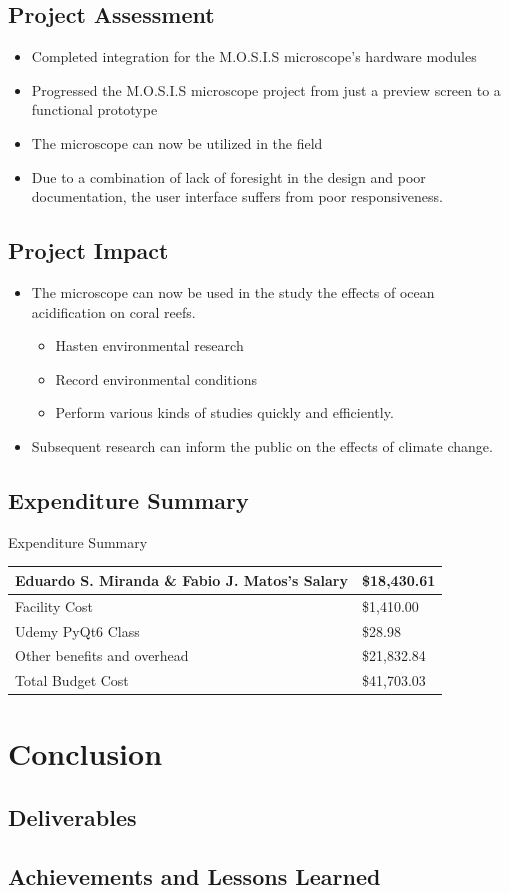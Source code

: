 \documentclass[17pt, aspectratio=169]{beamer}
\begin{document}
\subsection{Project Assessment}
\begin{itemize}
	\item Completed integration for the M.O.S.I.S microscope's hardware modules
	\item Progressed the M.O.S.I.S microscope project from just a preview screen to a functional prototype
	\item The microscope can now be utilized in the field
	\item Due to a combination of lack of foresight in the design and poor documentation, the user interface suffers from poor responsiveness.
\end{itemize}
\subsection*{Project Impact}
\begin{itemize}
	\item The microscope can now be used in the study the effects of ocean acidification on coral reefs.
	      \begin{itemize}
		      \item Hasten environmental research
		      \item Record environmental conditions
		      \item Perform various kinds of studies quickly and efficiently.
	      \end{itemize}
	\item Subsequent research can inform the public on the effects of climate change.
\end{itemize}
\subsection*{Expenditure Summary}
\begin{frame}{Expenditure Summary}
	\begin{center}
		\begin{tabular}{||m{} | m{} ||}
			\hline
			Eduardo S. Miranda \& Fabio J. Matos's Salary & \$18,430.61 \\
			\hline
			Facility Cost                                 & \$1,410.00  \\
			\hline
			Udemy PyQt6 Class                             & \$28.98     \\
			\hline
			Other benefits and overhead                   & \$21,832.84 \\
			\hline
			Total Budget Cost                             & \$41,703.03 \\
			\hline
		\end{tabular}
	\end{center}
\end{frame}
\section{Conclusion}
\subsection{Deliverables}
\subsection{Achievements and Lessons Learned}
\end{document}
